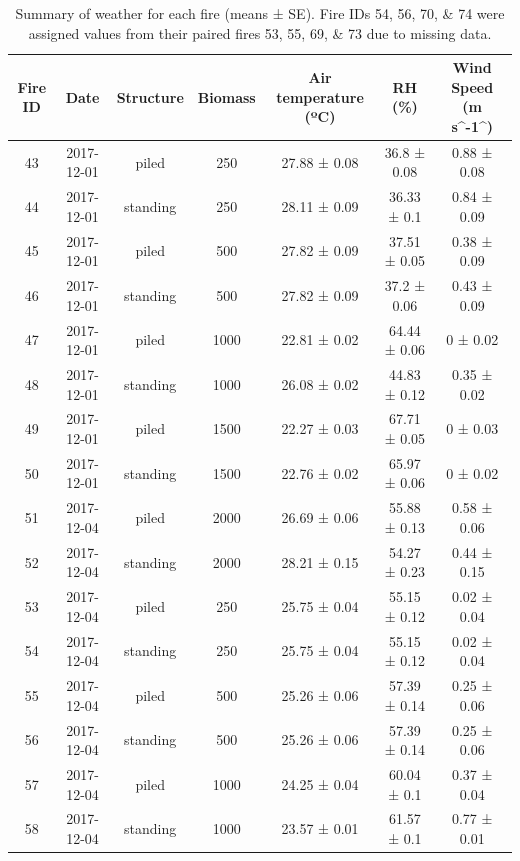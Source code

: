 \documentclass[11pt,a4paper]{article}
\begin{document}
\begin{table}

\caption{\label{tab:fire-weather-table}Summary of weather for each fire (means ± SE). Fire IDs 54, 56, 70, & 74 were assigned values from their paired fires 53, 55, 69, & 73 due to missing data.}
\centering
\begin{tabular}[t]{c|c|c|c|c|c|c}
\hline
Fire ID & Date & Structure & Biomass & Air temperature (ºC) & RH (\%) & Wind Speed (m s\textasciicircum{}-1\textasciicircum{})\\
\hline
43 & 2017-12-01 & piled & 250 & 27.88  ±  0.08 & 36.8  ±  0.08 & 0.88  ±  0.08\\
\hline
44 & 2017-12-01 & standing & 250 & 28.11  ±  0.09 & 36.33  ±  0.1 & 0.84  ±  0.09\\
\hline
45 & 2017-12-01 & piled & 500 & 27.82  ±  0.09 & 37.51  ±  0.05 & 0.38  ±  0.09\\
\hline
46 & 2017-12-01 & standing & 500 & 27.82  ±  0.09 & 37.2  ±  0.06 & 0.43  ±  0.09\\
\hline
47 & 2017-12-01 & piled & 1000 & 22.81  ±  0.02 & 64.44  ±  0.06 & 0  ±  0.02\\
\hline
48 & 2017-12-01 & standing & 1000 & 26.08  ±  0.02 & 44.83  ±  0.12 & 0.35  ±  0.02\\
\hline
49 & 2017-12-01 & piled & 1500 & 22.27  ±  0.03 & 67.71  ±  0.05 & 0  ±  0.03\\
\hline
50 & 2017-12-01 & standing & 1500 & 22.76  ±  0.02 & 65.97  ±  0.06 & 0  ±  0.02\\
\hline
51 & 2017-12-04 & piled & 2000 & 26.69  ±  0.06 & 55.88  ±  0.13 & 0.58  ±  0.06\\
\hline
52 & 2017-12-04 & standing & 2000 & 28.21  ±  0.15 & 54.27  ±  0.23 & 0.44  ±  0.15\\
\hline
53 & 2017-12-04 & piled & 250 & 25.75  ±  0.04 & 55.15  ±  0.12 & 0.02  ±  0.04\\
\hline
54 & 2017-12-04 & standing & 250 & 25.75  ±  0.04 & 55.15  ±  0.12 & 0.02  ±  0.04\\
\hline
55 & 2017-12-04 & piled & 500 & 25.26  ±  0.06 & 57.39  ±  0.14 & 0.25  ±  0.06\\
\hline
56 & 2017-12-04 & standing & 500 & 25.26  ±  0.06 & 57.39  ±  0.14 & 0.25  ±  0.06\\
\hline
57 & 2017-12-04 & piled & 1000 & 24.25  ±  0.04 & 60.04  ±  0.1 & 0.37  ±  0.04\\
\hline
58 & 2017-12-04 & standing & 1000 & 23.57  ±  0.01 & 61.57  ±  0.1 & 0.77  ±  0.01\\

\end{tabular}
\end{table}
\end{document}
